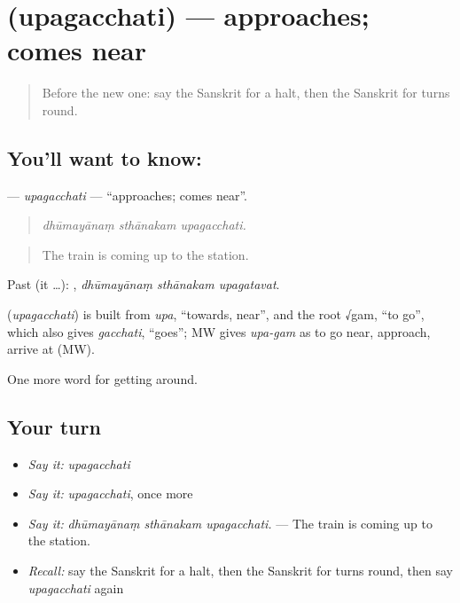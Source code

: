 \section[\texorpdfstring{\sk{उपगच्छति} (upagacchati)}{उपगच्छति (upagacchati)}]{ (upagacchati) — approaches; comes near}

\label{lesson:SA-C412-upagacchati}



\begin{quote}
Before the new one: say the Sanskrit for a halt, then the Sanskrit for turns round.
\end{quote}

\subsection*{You'll want to know: }
\textbf{} — \emph{upagacchati} — \textquotedblleft{}approaches; comes near\textquotedblright{}.

\begin{quote}
  
\end{quote}

\begin{quote}
\emph{dhūmayānaṃ sthānakam upagacchati.}
\end{quote}

\begin{quote}
The train is coming up to the station.
\end{quote}

Past (it …):   , \emph{dhūmayānaṃ sthānakam upagatavat}.

\begin{cousinweb}
\textbf{} (\emph{upagacchati}) is built from \emph{upa}, \textquotedblleft{}towards, near\textquotedblright{}, and the root √gam, \textquotedblleft{}to go\textquotedblright{}, which also gives \emph{gacchati}, \textquotedblleft{}goes\textquotedblright{}; MW gives \emph{upa-gam} as to go near, approach, arrive at (MW).
\end{cousinweb}

\begin{grammarlens}[title={What you've built}]
One more word for getting around.
\end{grammarlens}

\subsection*{Your turn}
\begin{itemize}
\raggedright
  \item \emph{Say it:} \emph{upagacchati}
  \item \emph{Say it:} \emph{upagacchati}, once more
  \item \emph{Say it:} \emph{dhūmayānaṃ sthānakam upagacchati.} — The train is coming up to the station.
  \item \emph{Recall:} say the Sanskrit for a halt, then the Sanskrit for turns round, then say \emph{upagacchati} again
\end{itemize}

